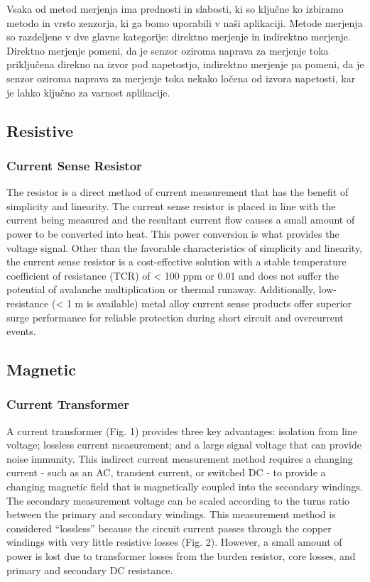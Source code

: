 \documentclass[12pt,a4paper,titlepage,openany]{report}
\begin{document}
Vsaka od metod merjenja ima prednosti in slabosti, ki so ključne ko izbiramo metodo in vrsto zenzorja, ki ga bomo uporabili
v naši aplikaciji. Metode merjenja so razdeljene v dve glavne kategorije: direktno merjenje in indirektno merjenje.
Direktno merjenje pomeni, da je senzor oziroma naprava za merjenje toka priključena direkno na izvor pod napetostjo, 
indirektno merjenje pa pomeni, da je senzor oziroma naprava za merjenje toka nekako ločena od izvora napetosti, 
kar je lahko ključno za varnost aplikacije.

\subsection{Resistive}
\subsubsection{Current Sense Resistor}
The resistor is a direct method of current measurement that has the benefit of simplicity and linearity. The current sense resistor
is placed in line with the current being measured and the resultant current flow causes a small amount of power to be converted
into heat. This power conversion is what provides the voltage signal. Other than the favorable characteristics of simplicity and
linearity, the current sense resistor is a cost-effective solution with a stable temperature coefficient of resistance (TCR) of
< 100 ppm or 0.01  and does not suffer the potential of avalanche multiplication or thermal runaway. Additionally,
low-resistance (< 1 m is available) metal alloy current sense products offer superior surge performance for reliable protection
during short circuit and overcurrent events.

\subsection{Magnetic}
\subsubsection{Current Transformer}
A current transformer (Fig. 1) provides three key advantages: isolation from line voltage; lossless current measurement; and a
large signal voltage that can provide noise immunity. This indirect current measurement method requires a changing current -
such as an AC, transient current, or switched DC - to provide a changing magnetic field that is magnetically coupled into the
secondary windings. The secondary measurement voltage can be scaled according to the turns ratio between the primary and
secondary windings. This measurement method is considered “lossless” because the circuit current passes through the copper
windings with very little resistive losses (Fig. 2). However, a small amount of power is lost due to transformer losses from the
burden resistor, core losses, and primary and secondary DC resistance.
\end{document}
